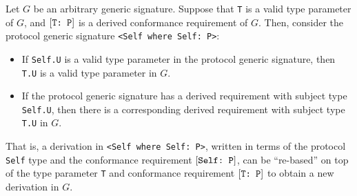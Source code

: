 \documentclass[../generics]{subfiles}
\begin{document}
\begin{lemma}\label{subst lemma}
Let $G$ be an arbitrary generic signature. Suppose that \texttt{T} is a valid type parameter of $G$, and $[\texttt{T:~P}]$ is a derived conformance requirement of $G$. Then, consider the protocol generic signature \verb|<Self where Self: P>|:
\begin{itemize}
\item If \texttt{Self.U} is a valid type parameter in the protocol generic signature, then \texttt{T.U} is a valid type parameter in $G$.
\item If the protocol generic signature has a derived requirement with subject type \texttt{Self.U}, then there is a corresponding derived requirement with subject type \texttt{T.U} in $G$.
\end{itemize}
That is, a derivation in \verb|<Self where Self: P>|, written in terms of the protocol \texttt{Self} type and the conformance requirement $[\texttt{Self:~P}]$, can be ``re-based'' on top of the type parameter \texttt{T} and conformance requirement $[\texttt{T:~P}]$ to obtain a new derivation in $G$.
\end{lemma}
\end{document}
